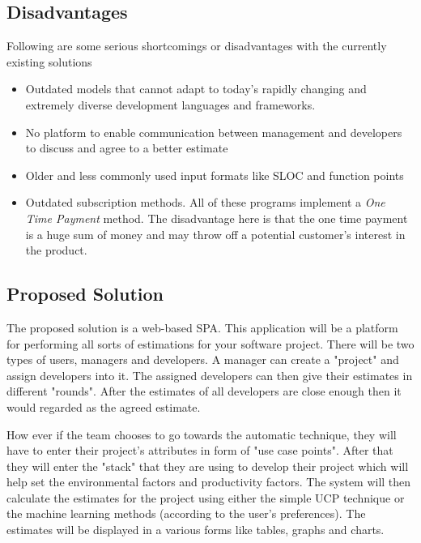 \subsection{Disadvantages}
Following are some serious shortcomings or disadvantages with the currently existing solutions
\begin{itemize}
	\item Outdated models that cannot adapt to today's rapidly changing and extremely diverse development languages and frameworks.
	\item No platform to enable communication between management and developers to discuss and agree to a better estimate
	\item Older and less commonly used input formats like SLOC and function points
	\item Outdated subscription methods. All of these programs implement a {\it{One Time Payment}} method. The disadvantage here is that the one time payment is a huge sum of money and may throw off a potential customer's interest in the product.
\end{itemize}









\subsection{Proposed Solution}
The proposed solution is a web-based SPA. This application will be a platform for performing all sorts of estimations for your software project. There will be two types of users, managers and developers. A manager can create a "project" and assign developers into it. The assigned developers can then give their estimates in different "rounds". After the estimates of all developers are close enough then it would regarded as the agreed estimate.

How ever if the team chooses to go towards the automatic technique, they will have to enter their project's attributes in form of "use case points". After that they will enter the "stack" that they are using to develop their project which will help set the environmental factors and productivity factors. The system will then calculate the estimates for the project using either the simple UCP technique or the machine learning methods (according to the user's preferences). The estimates will be displayed in a various forms like tables, graphs and charts.







